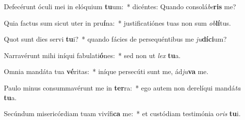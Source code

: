 \item Defecérunt óculi mei in elóquium \textbf{tu}um:~* dicéntes: Quando consolá\textit{be}\textbf{ris} me?
\item Quia factus sum sicut uter in pru\textbf{í}na:~* justificatiónes tuas non sum \textit{ob}\textbf{lí}tus.
\item Quot sunt dies servi \textbf{tu}i?~* quando fácies de persequéntibus me \textit{ju}\textbf{dí}\textbf{ci}um?
\item Narravérunt mihi iníqui fabulati\textbf{ó}nes:~* sed non ut \textit{lex} \textbf{tu}a.
\item Omnia mandáta tua \textbf{vé}ritas:~* iníque persecúti sunt me, ád\textit{ju}\textbf{va} me.
\item Paulo minus consummavérunt me in \textbf{ter}ra:~* ego autem non derelíqui mandá\textit{ta} \textbf{tu}a.
\item Secúndum misericórdiam tuam vivífi\textbf{ca} me:~* et custódiam testimónia o\textit{ris} \textbf{tu}i.
